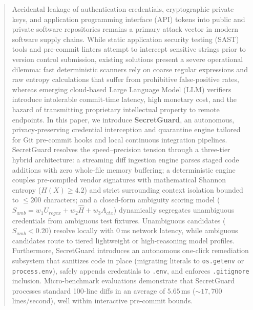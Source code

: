 \begin{abstract}
Accidental leakage of authentication credentials, cryptographic private keys, and application programming interface (API) tokens into public and private software repositories remains a primary attack vector in modern software supply chains. While static application security testing (SAST) tools and pre-commit linters attempt to intercept sensitive strings prior to version control submission, existing solutions present a severe operational dilemma: fast deterministic scanners rely on coarse regular expressions and raw entropy calculations that suffer from prohibitive false-positive rates, whereas emerging cloud-based Large Language Model (LLM) verifiers introduce intolerable commit-time latency, high monetary cost, and the hazard of transmitting proprietary intellectual property to remote endpoints. In this paper, we introduce \textbf{SecretGuard}, an autonomous, privacy-preserving credential interception and quarantine engine tailored for Git pre-commit hooks and local continuous integration pipelines. SecretGuard resolves the speed--precision tension through a three-tier hybrid architecture: a streaming diff ingestion engine parses staged code additions with zero whole-file memory buffering; a deterministic engine couples pre-compiled vendor signatures with mathematical Shannon entropy ($H(X) \ge 4.2$) and strict surrounding context isolation bounded to $\le 200$ characters; and a closed-form ambiguity scoring model ($S_{amb} = w_1 U_{regex} + w_2 \hat{H} + w_3 A_{ctx}$) dynamically segregates unambiguous credentials from ambiguous test fixtures. Unambiguous candidates ($S_{amb} < 0.20$) resolve locally with 0\,ms network latency, while ambiguous candidates route to tiered lightweight or high-reasoning model profiles. Furthermore, SecretGuard introduces an autonomous one-click remediation subsystem that sanitizes code in place (migrating literals to \texttt{os.getenv} or \texttt{process.env}), safely appends credentials to \texttt{.env}, and enforces \texttt{.gitignore} inclusion. Micro-benchmark evaluations demonstrate that SecretGuard processes standard 100-line diffs in an average of $5.65$\,ms ($\sim 17,700$ lines/second), well within interactive pre-commit bounds.
\end{abstract}
